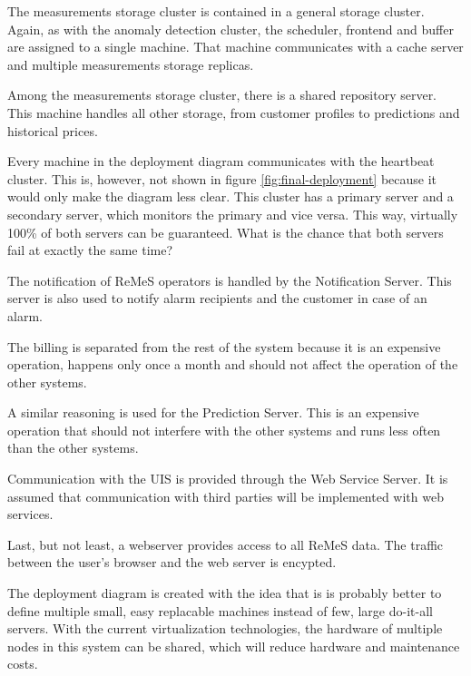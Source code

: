 \npar The measurements storage cluster is contained in a general storage
cluster. Again, as with the anomaly detection cluster, the scheduler, frontend
and buffer are assigned to a single machine. That machine communicates with a
cache server and multiple measurements storage replicas. 

\npar Among the measurements storage cluster, there is a shared repository
server. This machine handles all other storage, from customer profiles to
predictions and historical prices. 

\npar Every machine in the deployment diagram communicates with the heartbeat
cluster. This is, however, not shown in figure \ref{fig:final-deployment}
because it would only make the diagram less clear. This cluster has a primary
server and a secondary server, which monitors the primary and vice versa. This
way, virtually 100\% of both servers can be guaranteed. What is the chance that
both servers fail at exactly the same time?

\npar The notification of ReMeS operators is handled by the Notification Server.
This server is also used to notify alarm recipients and the customer in case of
an alarm. 

\npar The billing is separated from the rest of the system because it is an
expensive operation, happens only once a month and should not affect the
operation of the other systems. 

\npar A similar reasoning is used for the Prediction Server. This is an
expensive operation that should not interfere with the other systems and runs
less often than the other systems.

\npar Communication with the UIS is provided through the Web Service Server. It
is assumed that communication with third parties will be implemented with web
services. 

\npar Last, but not least, a webserver provides access to all ReMeS data. The
traffic between the user's browser and the web server is encypted.

\npar The deployment diagram is created with the idea that is is probably better
to define multiple small, easy replacable machines instead of few, large
do-it-all servers. With the current virtualization technologies, the hardware of
multiple nodes in this system can be shared, which will reduce hardware and
maintenance costs.